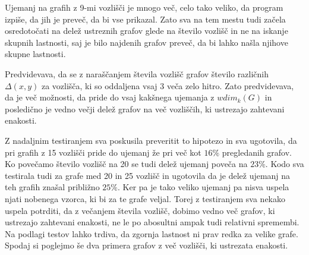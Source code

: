 \documentclass[12pt,a4paper]{amsart}
\theoremstyle{plain} %
\begin{document}
Ujemanj na grafih z 9-mi vozlišči je mnogo več, celo tako veliko,
da program izpiše, da jih je preveč, da bi vse prikazal. Zato sva na tem mestu tudi začela osredotočati na delež ustreznih grafov glede na število vozlišč in ne na iskanje skupnih lastnosti, saj je bilo najdenih grafov preveč, da bi lahko našla njihove skupne lastnosti. 

Predvidevava, da se z naraščanjem števila vozlišč grafov število različnih $\Delta(x,y)$ za vozlišča, ki so oddaljena vsaj 3 veča zelo hitro.
Zato predvidevava, da je več možnosti, da pride do vsaj kakšnega ujemanja z $wdim_k(G)$ in posledično je vedno večji delež grafov na več vozliščih, ki ustrezajo zahtevani enakosti.

Z nadaljnim testiranjem sva poskusila preveritit to hipotezo in sva ugotovila, da pri grafih z 15 vozlišči pride do ujemanj že pri več kot $16 \%$ pregledanih grafov. Ko povečamo število vozlišč na 20 se tudi delež ujemanj poveča na $23 \%$.
Kodo sva testirala tudi za grafe med 20 in 25 vozlišč in ugotovila da je delež ujemanj na teh grafih znašal približno $25 \%$.
Ker pa je tako veliko ujemanj pa nisva uspela njati nobenega vzorca, 
ki bi za te grafe veljal. 
Torej z testiranjem sva nekako uspela potrditi, da z večanjem števila vozlišč, dobimo vedno več grafov, ki ustrezajo zahtevani enakosti, ne le po abosultni 
ampak tudi relativni spremembi. Na podlagi testov lahko trdiva, da zgornja lastnost ni prav redka za velike grafe. Spodaj si poglejmo še dva primera grafov z več vozlišči, ki ustrezata enakosti. 
\bigskip

\bigskip
\end{document}

